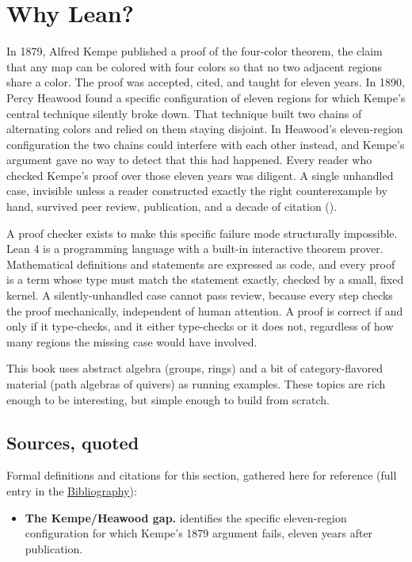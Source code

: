 \section{Why Lean?}\label{sec:00-setup:01-why-lean:1}

In 1879, Alfred Kempe published a proof of the four-color theorem, the claim that any map can be colored with four colors so that no two adjacent regions share a color. The proof was accepted, cited, and taught for eleven years. In 1890, Percy Heawood found a specific configuration of eleven regions for which Kempe's central technique silently broke down. That technique built two chains of alternating colors and relied on them staying disjoint. In Heawood's eleven-region configuration the two chains could interfere with each other instead, and Kempe's argument gave no way to detect that this had happened. Every reader who checked Kempe's proof over those eleven years was diligent. A single unhandled case, invisible unless a reader constructed exactly the right counterexample by hand, survived peer review, publication, and a decade of citation (\cite{Heawood1890}).

A proof checker exists to make this specific failure mode structurally impossible. Lean 4 is a programming language with a built-in interactive theorem prover. Mathematical definitions and statements are expressed as code, and every proof is a term whose type must match the statement exactly, checked by a small, fixed kernel. A silently-unhandled case cannot pass review, because every step checks the proof mechanically, independent of human attention. A proof is correct if and only if it type-checks, and it either type-checks or it does not, regardless of how many regions the missing case would have involved.

This book uses abstract algebra (groups, rings) and a bit of category-flavored material (path algebras of quivers) as running examples. These topics are rich enough to be interesting, but simple enough to build from scratch.

\subsection{Sources, quoted}\label{sec:00-setup:01-why-lean:2}

Formal definitions and citations for this section, gathered here for reference (full entry in the \hyperref[sec:root:bibliography:1]{Bibliography}):

\begin{itemize}
\tightlist
\item
  \textbf{The Kempe/Heawood gap.} \cite{Heawood1890} identifies the specific eleven-region configuration for which Kempe's 1879 argument fails, eleven years after publication.
\end{itemize}

